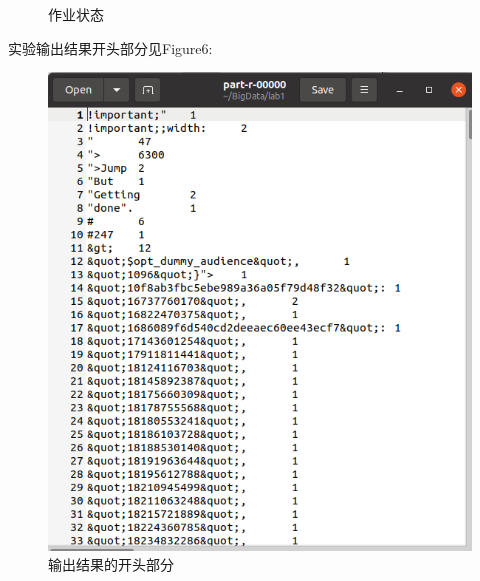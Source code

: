 \documentclass[a4paper,UTF8]{article}
\theoremstyle{definition}
\begin{document}
\begin{CJK}{UTF8}{gkai}
\begin{enumerate}
\begin{figure}[h!]
    \caption{作业状态}
    \end{figure} 
	\par 实验输出结果开头部分见Figure6:
	\begin{figure}[h]
    \centering
    \includegraphics{./out.png}
    \caption{输出结果的开头部分}
    \end{figure} 
\end{enumerate}
\begin{CJK*}{UTF8}{gbsn}

\end{CJK*}
\end{CJK}
\end{document}
